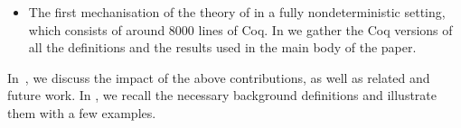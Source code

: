 \begin{itemize}
  
\item
  The first mechanisation of the
  theory of \mustpreorder in a fully nondeterministic setting,
  which consists of around 8000 lines of Coq.
  In  we gather the Coq versions of all the
  definitions and the results used in the main body of the paper.
\end{itemize}

In~, we discuss the impact of the above
contributions, as well as related and future work.
In , we recall the necessary background
  definitions and illustrate them with a few examples.





